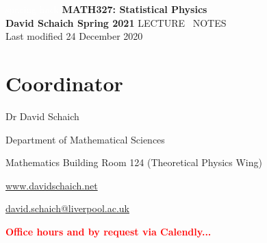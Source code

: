 \documentclass[12 pt]{article}
\newcommand{\mutesection}[1]{\vspace{-\medskipamount}\section*{#1}\vspace{-\medskipamount}}
\newcommand{\TODO}[1]{\textcolor{red}{\textbf{#1}}}
\begin{document}
\begin{center}
  \textcolor{white}{spacing hack}
  \vfill
  {\LARGE \textbf{MATH327: Statistical Physics}} \\[6 pt]
  \textbf{David Schaich \qquad\qquad\qquad\qquad Spring 2021}
  \vfill
  {\LARGE LECTURE \ NOTES} \\[6 pt]
  Last modified 24 December 2020
  \vfill
\end{center}
\clearpage



\mutesection{Coordinator}
\begin{description}
  \setlength{\itemsep}{1pt}
  \setlength{\parskip}{0pt}
  \setlength{\parsep}{0pt}
  \item[\qquad] Dr David Schaich
  \item[\qquad] Department of Mathematical Sciences
  \item[\qquad] Mathematics Building Room 124 (Theoretical Physics Wing)
  \item[\qquad] \href{http://www.davidschaich.net}{www.davidschaich.net}
  \item[\qquad] \href{mailto:david.schaich@liverpool.ac.uk}{david.schaich@liverpool.ac.uk}
  \item[\qquad] \TODO{Office hours and by request via Calendly...}
\end{description}
\end{document}
